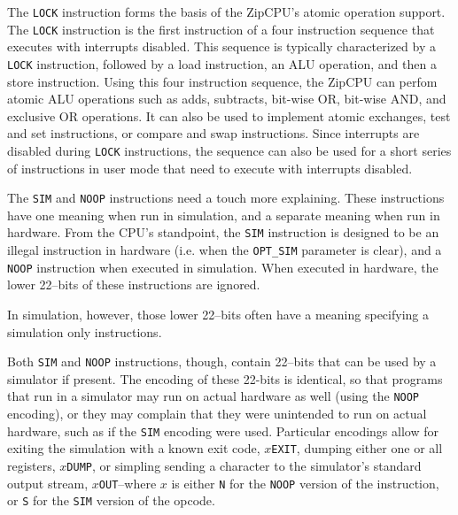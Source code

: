 \documentclass{gqtekspec}
\begin{document}
The {\tt LOCK} instruction forms the basis of the ZipCPU's atomic operation
support.  The {\tt LOCK} instruction is the first instruction of a four
instruction sequence that executes with interrupts disabled.  This sequence is
typically characterized by a {\tt LOCK} instruction, followed by a load
instruction, an ALU operation, and then a store instruction.  Using this four
instruction sequence, the
ZipCPU can perfom atomic ALU operations such as adds, subtracts, bit-wise
OR, bit-wise AND, and exclusive OR operations.  It can also be used to
implement atomic exchanges, test and set instructions, or compare and swap
instructions.  Since interrupts are disabled during {\tt LOCK} instructions,
the sequence can also be used for a short series of instructions in user mode
that need to execute with interrupts disabled.

The {\tt SIM} and {\tt NOOP} instructions need a touch more explaining.
These instructions have one meaning when run in simulation, and a separate
meaning when run in hardware.  From the CPU's standpoint, the {\tt SIM}
instruction is designed to be an illegal instruction in hardware (i.e. when the
{\tt OPT\_SIM} parameter is clear), and a {\tt NOOP} instruction when executed
in simulation.  When executed in hardware, the lower 22--bits of these
instructions are ignored.

In simulation, however, those lower 22--bits often have a meaning specifying
a simulation only instructions.

Both {\tt SIM} and {\tt NOOP} instructions, though, contain 22--bits that can
be used by a simulator if present.  The encoding of these 22-bits is identical,
so that programs that run in a simulator may run on actual hardware as well
(using the {\tt NOOP} encoding), or they may complain that they were unintended
to run on actual hardware, such as if the {\tt SIM} encoding were used.
Particular encodings allow for exiting the simulation with a known exit
code, {\tt $x$EXIT}, dumping either one or all registers, {\tt $x$DUMP}, 
or simpling sending a character to the simulator's standard output stream,
{\tt $x$OUT}--where $x$ is either {\tt N} for the {\tt NOOP} version of the
instruction, or {\tt S} for the {\tt SIM} version of the opcode.
\end{document}
